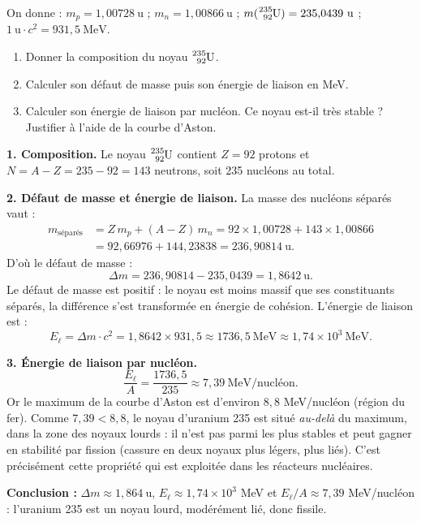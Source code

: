 \documentclass[11pt]{article}
\newcommand{\cle}[1]{{\popxbold\color{popdark}#1}}
\begin{document}
\begin{exoresolu}
On donne : $m_p = 1{,}00728\ \mathrm{u}$ ; $m_n = 1{,}00866\ \mathrm{u}$ ; $m(\ce{^{235}_{92}U}) = 235{,}0439\ \mathrm{u}$ ; $1\ \mathrm{u} \cdot c^2 = 931{,}5\ \mathrm{MeV}$.
\begin{enumerate}
\item Donner la composition du noyau $\ce{^{235}_{92}U}$.
\item Calculer son défaut de masse puis son énergie de liaison en MeV.
\item Calculer son énergie de liaison par nucléon. Ce noyau est-il très stable ? Justifier à l'aide de la courbe d'Aston.
\end{enumerate}
\tcblower
\textbf{1. Composition.} Le noyau $\ce{^{235}_{92}U}$ contient $Z = 92$ protons et $N = A - Z = 235 - 92 = 143$ neutrons, soit 235 nucléons au total.

\textbf{2. Défaut de masse et énergie de liaison.} La masse des nucléons séparés vaut :
\begin{align*}
m_{\text{séparés}} &= Z\,m_p + (A-Z)\,m_n = 92 \times 1{,}00728 + 143 \times 1{,}00866 \\
&= 92{,}66976 + 144{,}23838 = 236{,}90814\ \mathrm{u}.
\end{align*}
D'où le défaut de masse :
\[ \Delta m = 236{,}90814 - 235{,}0439 = 1{,}8642\ \mathrm{u}. \]
Le défaut de masse est positif : le noyau est moins massif que ses constituants séparés, la différence s'est transformée en énergie de cohésion. L'énergie de liaison est :
\[ E_\ell = \Delta m \cdot c^2 = 1{,}8642 \times 931{,}5 \approx 1736{,}5\ \mathrm{MeV} \approx 1{,}74 \times 10^{3}\ \mathrm{MeV}. \]

\textbf{3. Énergie de liaison par nucléon.}
\[ \frac{E_\ell}{A} = \frac{1736{,}5}{235} \approx 7{,}39\ \mathrm{MeV/nucléon}. \]
Or le maximum de la courbe d'Aston est d'environ $8{,}8$ MeV/nucléon (région du fer). Comme $7{,}39 < 8{,}8$, le noyau d'uranium 235 est situé \emph{au-delà} du maximum, dans la zone des noyaux lourds : il n'est pas parmi les plus stables et peut gagner en stabilité par \cle{fission} (cassure en deux noyaux plus légers, plus liés). C'est précisément cette propriété qui est exploitée dans les réacteurs nucléaires.

\textbf{Conclusion :} $\Delta m \approx 1{,}864\ \mathrm{u}$, $E_\ell \approx 1{,}74 \times 10^{3}$ MeV et $E_\ell/A \approx 7{,}39$ MeV/nucléon : l'uranium 235 est un noyau lourd, modérément lié, donc fissile.
\end{exoresolu}
\end{document}
